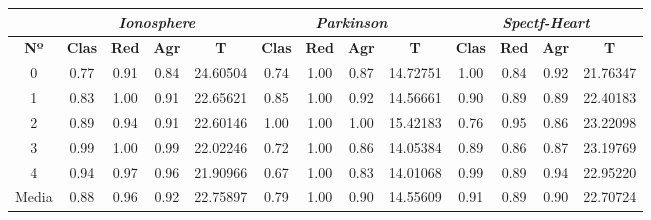 \documentclass[10pt, a4paper]{article}
\theoremstyle{theorem-style}
\theoremstyle{theorem-style}
\theoremstyle{theorem2-style}
\theoremstyle{definition-style}
\theoremstyle{remark-style}
\theoremstyle{example-style}
\theoremstyle{definition-style}
\theoremstyle{remark-style}
\theoremstyle{remark-style}
\begin{document}
\begin{table}[ht!]
\begin{tabular}{ccccc|cccc|cccc}
\centering
 & \multicolumn{4}{c}{\textit{Ionosphere}} & \multicolumn{4}{c}{\textit{Parkinson}} & \multicolumn{4}{c}{\textit{Spectf-Heart}} \\ \hline
\textbf{Nº} & \textbf{Clas} & \textbf{Red} & \textbf{Agr} & \textbf{T} & \textbf{Clas} & \textbf{Red} & \textbf{Agr} & \textbf{T} & \textbf{Clas} & \textbf{Red} & \textbf{Agr} & \textbf{T} \\ \hline
0&	 0.77 & 0.91 & 0.84 & 24.60504 & 	0.74 & 1.00 & 0.87 & 14.72751 & 1.00 & 0.84 & 0.92 & 21.76347 \\ 
1&	 0.83 & 1.00 & 0.91 & 22.65621 & 	0.85 & 1.00 & 0.92 & 14.56661 & 0.90 & 0.89 & 0.89 & 22.40183 \\ 
2&	 0.89 & 0.94 & 0.91 & 22.60146 & 	1.00 & 1.00 & 1.00 & 15.42183 & 0.76 & 0.95 & 0.86 & 23.22098 \\ 
3&	 0.99 & 1.00 & 0.99 & 22.02246 & 	0.72 & 1.00 & 0.86 & 14.05384 & 0.89 & 0.86 & 0.87 & 23.19769 \\ 
4&	 0.94 & 0.97 & 0.96 & 21.90966 & 	0.67 & 1.00 & 0.83 & 14.01068 & 0.99 & 0.89 & 0.94 & 22.95220 \\ 
\hline
Media&	 0.88 & 0.96 & 0.92 & 22.75897 &	0.79 & 1.00 & 0.90 & 14.55609 &		0.91 & 0.89 & 0.90 & 22.70724
 \\

\end{tabular}
\end{table}
\end{document}
